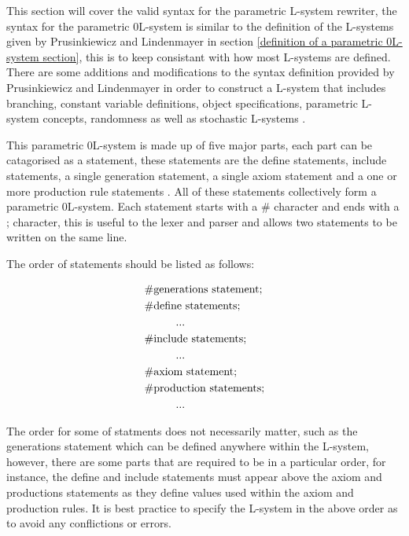 This section will cover the valid syntax for the parametric L-system rewriter, the syntax for the parametric 0L-system is similar to the definition of the L-systems given by Prusinkiewicz and Lindenmayer in section \ref{definition of a parametric 0L-system section}, this is to keep consistant with how most L-systems are defined. There are some additions and modifications to the syntax definition provided by Prusinkiewicz and Lindenmayer in order to construct a L-system that includes branching, constant variable definitions, object specifications, parametric L-system concepts, randomness as well as stochastic L-systems \cite{prusinkiewicz2012algorithmic}. 

This parametric 0L-system is made up of five major parts, each part can be catagorised as a statement, these statements are the define statements, include statements, a single generation statement, a single axiom statement and a one or more production rule statements \cite{prusinkiewicz2013lindenmayer}. All of these statements collectively form a parametric 0L-system. Each statement starts with a \# character and ends with a ; character, this is useful to the lexer and parser and allows two statements to be written on the same line. 

The order of statements should be listed as follows: 

\begin{equation} \label{statement order example}
\begin{aligned}
	&\text{\#generations statement;}\\
	&\text{\#define statements;}\\
	&\text{\hspace{10mm}...}\\
	&\text{\#include statements;}\\
	&\text{\hspace{10mm}...}\\
	&\text{\#axiom statement;}\\
	&\text{\#production statements;}\\
	&\text{\hspace{10mm}...}\\
\end{aligned}
\end{equation}

The order for some of statments does not necessarily matter, such as the generations statement which can be defined anywhere within the L-system, however, there are some parts that are required to be in a particular order, for instance, the define and include statements must appear above the axiom and productions statements as they define values used within the axiom and production rules. It is best practice to specify the L-system in the above order as to avoid any conflictions or errors. 


